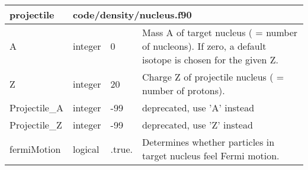 \documentclass{article}
\begin{document}
\begin{longtable}{llll}
\toprule
\textbf{\large{projectile}} & \multicolumn{3}{l}{\footnotesize{code/density/nucleus.f90}}\\*
\midrule
\endfirsthead
\midrule
\endhead
A & \begin{minipage}[t]{2cm}integer\end{minipage} & \begin{minipage}[t]{2cm}0\end{minipage} & \begin{minipage}[t]{12cm}Mass A of target nucleus ( = number of nucleons). If zero, a default isotope is chosen for the given Z.\end{minipage}\\*
\midrule
Z & \begin{minipage}[t]{2cm}integer\end{minipage} & \begin{minipage}[t]{2cm}20\end{minipage} & \begin{minipage}[t]{12cm}Charge Z of projectile nucleus ( = number of protons).\end{minipage}\\*
\midrule
Projectile\_A & \begin{minipage}[t]{2cm}integer\end{minipage} & \begin{minipage}[t]{2cm}-99\end{minipage} & \begin{minipage}[t]{12cm}deprecated, use 'A' instead\end{minipage}\\*
\midrule
Projectile\_Z & \begin{minipage}[t]{2cm}integer\end{minipage} & \begin{minipage}[t]{2cm}-99\end{minipage} & \begin{minipage}[t]{12cm}deprecated, use 'Z' instead\end{minipage}\\*
\midrule
fermiMotion & \begin{minipage}[t]{2cm}logical\end{minipage} & \begin{minipage}[t]{2cm}.true.\end{minipage} & \begin{minipage}[t]{12cm}Determines whether particles in target nucleus feel Fermi motion.\end{minipage}\\*

\end{longtable}
\end{document}
